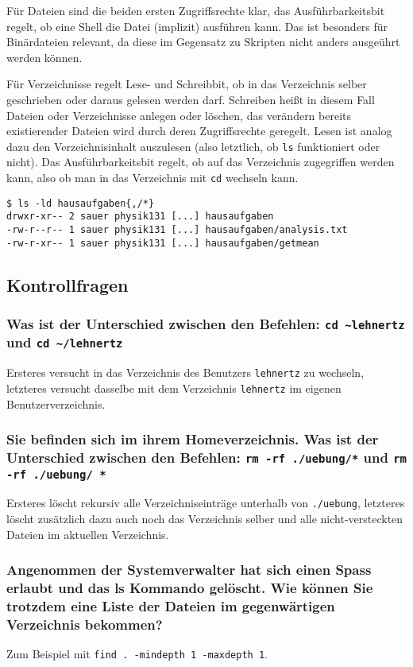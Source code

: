 F\"ur Dateien sind die beiden ersten Zugriffsrechte klar, das
Ausf\"uhrbarkeitsbit regelt, ob eine Shell die Datei (implizit) ausf\"uhren
kann. Das ist besonders f\"ur Bin\"ardateien relevant, da diese im Gegensatz zu
Skripten nicht anders ausge\"uhrt werden k\"onnen.

F\"ur Verzeichnisse regelt Lese- und Schreibbit, ob in das Verzeichnis selber
geschrieben oder daraus gelesen werden darf. Schreiben hei\ss{}t in diesem Fall
Dateien oder Verzeichnisse anlegen oder l\"oschen, das ver\"andern bereits
existierender Dateien wird durch deren Zugriffsrechte geregelt. Lesen ist analog
dazu den Verzeichnisinhalt auszulesen (also letztlich, ob \lstinline'ls'
funktioniert oder nicht). Das Ausf\"uhrbarkeitsbit regelt, ob auf das
Verzeichnis zugegriffen werden kann, also ob man in das Verzeichnis mit
\lstinline'cd' wechseln kann. %

\begin{lstlisting}[style=Bash]
$ ls -ld hausaufgaben{,/*}
drwxr-xr-- 2 sauer physik131 [...] hausaufgaben
-rw-r--r-- 1 sauer physik131 [...] hausaufgaben/analysis.txt
-rw-r-xr-- 1 sauer physik131 [...] hausaufgaben/getmean
\end{lstlisting}

\subsection{Kontrollfragen}

\subsubsection*{Was ist der Unterschied zwischen den Befehlen: \lstinline'cd
~lehnertz' und \lstinline'cd ~/lehnertz'}
Ersteres versucht in das Verzeichnis des Benutzers \verb'lehnertz' zu wechseln,
letzteres versucht dasselbe mit dem Verzeichnis \verb'lehnertz' im eigenen
Benutzerverzeichnis.

\subsubsection*{Sie befinden sich im ihrem Homeverzeichnis. Was ist der
Unterschied zwischen den Befehlen: \lstinline'rm -rf ./uebung/*' und
\lstinline'rm -rf ./uebung/ *'}
Ersteres l\"oscht rekursiv alle Verzeichniseintr\"age unterhalb von
\verb'./uebung', letzteres l\"oscht zus\"atzlich dazu auch noch das Verzeichnis
selber und alle nicht-versteckten Dateien im aktuellen Verzeichnis.

\subsubsection*{Angenommen der Systemverwalter hat sich einen Spass erlaubt und
das ls Kommando gel\"oscht. Wie k\"onnen Sie trotzdem eine Liste der Dateien im
gegenw\"artigen Verzeichnis bekommen?}
Zum Beispiel mit \lstinline'find . -mindepth 1 -maxdepth 1'.

